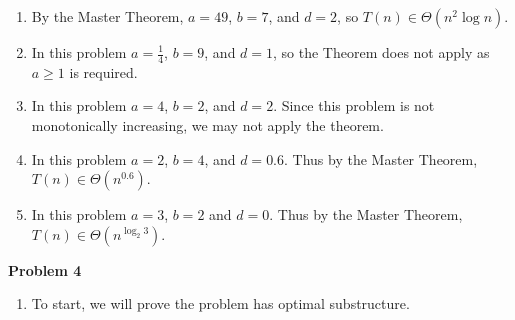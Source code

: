 \documentclass{article}
\newcommand{\Problem}[1]{\textbf{Problem #1}}
\begin{document}
\begin{enumerate}

\item By the Master Theorem, $a = 49$, $b = 7$, and $d = 2$, so $T(n) \in \Theta(n^2\log{n})$.
\item In this problem $a = \frac{1}{4}$, $b = 9$, and $d = 1$, so the Theorem does not apply as $a \geq 1$ is required. 
\item In this problem $a = 4$, $b = 2$, and $d = 2$. Since this problem is not monotonically increasing, we may not apply the theorem.
\item In this problem $a = 2$, $b = 4$, and $d = 0.6$. Thus by the Master Theorem, $T(n) \in \Theta(n^{0.6})$.
\item In this problem $a = 3$, $b = 2$ and $d = 0$. Thus by the Master Theorem, $T(n) \in \Theta(n^{\log_2{3}})$.

\end{enumerate}

\Problem{4}

\begin{enumerate}

\item To start, we will prove the problem has optimal substructure. 


\end{enumerate}
\end{document}
